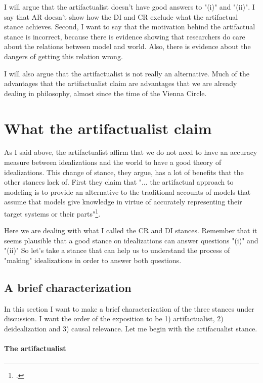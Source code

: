 I will argue that the artifactualist doesn't have good answers to "(i)" and "(ii)".
I say that AR doesn't show how the DI and CR exclude what the artifactual stance achieves.
Second, I want to say that the motivation behind the artifactual stance is incorrect, because there is evidence showing that researchers do care about the relations between model and world.
Also, there is evidence about the dangers of getting this relation wrong.

I will also argue that the artifactualist is not really an alternative.
Much of the advantages that the artifactualist claim are advantages that we are already dealing in philosophy, almost since the time of the Vienna Circle.


\section{What the artifactualist claim}

As I said above, the artifactualist affirm that we do not need to have an accuracy measure between idealizations and the world to have a good theory of idealizations.
This change of stance, they argue, has a lot of benefits that the other stances lack of.
First they claim that "$\ldots$ the artifactual approach to modeling is to provide an alternative to the traditional accounts of models that assume that models give knowledge in virtue of accurately representing their target systems or their parts"\footcite[][pp. 51-52]{Carrillo2022}. 

Here we are dealing with what I called the CR and DI stances.
Remember that it seems plausible that a good stance on idealizations can answer questions "(i)" and "(ii)" 
So let's take a stance that can help us to understand the process of "making" idealizations in order to answer both questions.


\subsection{A brief characterization}

In this section I want to make a brief characterization of the three stances under discussion.
I want the order of the exposition to be 1) artifactualist, 2) deidealization and 3) causal relevance.
Let me begin with the artifacualist stance.

\paragraph{The artifactualist}

